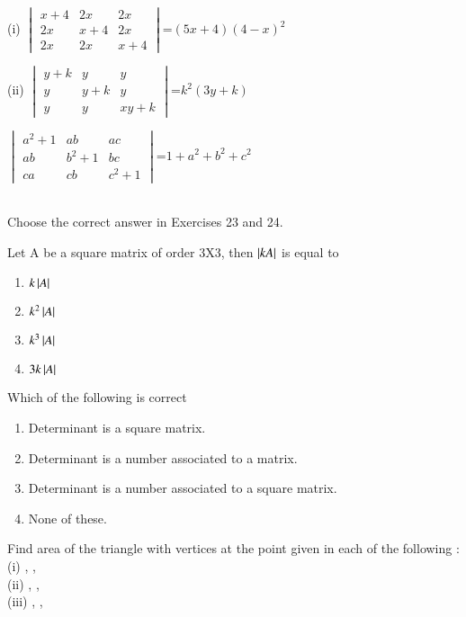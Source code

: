 \item (i) $\begin{vmatrix}x+4&2x&2x \\ 2x&x+4&2x \\ 2x&2x&x+4\end{vmatrix}$=$(5x+4)(4-x)^2$\\
\solution 

(ii) $\begin{vmatrix}y+k&y&y \\ y&y+k&y \\ y&y&xy+k\end{vmatrix}$=$k^2(3y+k)$
\\
\solution 


\item $\begin{vmatrix}a^2+1&ab&ac \\ ab&b^2+1&bc \\ ca&cb&c^2+1\end{vmatrix}$=$1+a^2+b^2+c^2$\\
\\
\solution 

Choose the correct answer in Exercises 23 and 24.
\item Let A be a square matrix of order 3X3, then 
$\left\vert kA\right\vert$ is equal to
\begin{enumerate}
\item $k\left\vert A\right\vert$
\item $k^2\left\vert A\right\vert$
\item $k^3\left\vert A\right\vert$
\item $3k\left\vert A\right\vert$
\end{enumerate} 
\item Which of the following is correct
\begin{enumerate}
\item Determinant is a square matrix.
\item Determinant is a number associated to a matrix.
\item Determinant is a number associated to a square matrix.
\item None of these.
\end{enumerate}
\item Find area of the triangle with vertices at the point given in each of the following :\\
(i) , , \\
(ii) , , \\
(iii) , , \\
